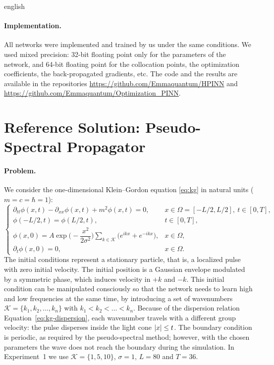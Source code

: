 \documentclass[../0000.tex]{subfiles}
\begin{document}
\begin{hyphenrules}{english}
\paragraph{Implementation.}
All networks were implemented and trained by us under the same conditions. We used mixed precision:
32-bit floating point only for the parameters of the network, and 64-bit floating point for the
collocation points, the optimization coefficients, the back-propagated gradients, etc. The code and the
results are available in the repositories
\url{https://github.com/Emmaquantum/HPINN} and \url{https://github.com/Emmaquantum/Optimization_PINN}.

\section{Reference Solution: Pseudo-Spectral Propagator}\label{sec:reference-solution}

\paragraph{Problem.}
We consider the one-dimensional Klein--Gordon equation \eqref{eq:kg} in natural units ($m=c=\hbar=1$):
\begin{equation}
  \begin{cases}
    \partial_{tt}\phi(x,t)-\partial_{xx}\phi(x,t)+m^2\phi(x,t)=0, & x\in\Omega=[-L/2,L/2],\ t\in[0,T],\\
    \phi(-L/2,t)=\phi(L/2,t), & t\in[0,T],\\
    \phi(x,0)=A\exp\Big(-\dfrac{x^2}{2\sigma^2}\Big)\displaystyle\sum_{k\in\mathcal{K}}\big(e^{ikx}+e^{-ikx}\big), & x\in\Omega,\\
    \partial_t\phi(x,0)=0, & x\in\Omega.
  \end{cases}
  \label{eq:kg-problem}
\end{equation}
The initial conditions represent a stationary particle, that is, a localized pulse with zero initial
velocity. The initial position is a Gaussian envelope modulated by a symmetric phase, which induces
velocity in $+k$ and $-k$. This initial condition can be manipulated consciously so that the network
needs to learn high and low frequencies at the same time, by introducing a set of wavenumbers
$\mathcal{K}=\{k_1,k_2,\dots,k_n\}$ with $k_1<k_2<\dots<k_n$. Because of the dispersion relation
Equation~\eqref{eq:kg-dispersion}, each wavenumber travels with a different group velocity: the pulse disperses
inside the light cone $\left\lvert x \right\rvert\le t$. The boundary condition is periodic, as required by the
pseudo-spectral method; however, with the chosen parameters the wave does not reach the boundary during
the simulation. In Experiment~1 we use $\mathcal{K}=\{1,5,10\}$, $\sigma=1$, $L=80$ and $T=36$.


\end{hyphenrules}
\end{document}
